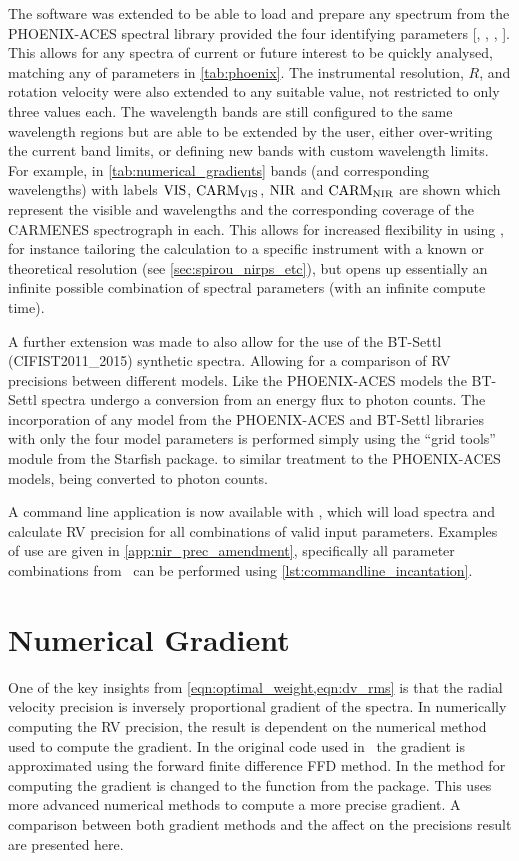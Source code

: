 The software was extended to be able to load and prepare any spectrum from the {PHOENIX-ACES} spectral library provided the four identifying parameters [\Teff, \Logg, \feh{}, \alphafe{}].
This allows for any spectra of current or future interest to be quickly analysed, matching any of parameters in \cref{tab:phoenix}.
The instrumental resolution, \(R\), and rotation velocity \Vsini{} were also extended to any suitable value, not restricted to only three values each.
The \nir{} wavelength bands are still configured to the same wavelength regions but are able to be extended by the user, either over-writing the current band limits, or defining new bands with custom wavelength limits.
For example, in \cref{tab:numerical_gradients} bands (and corresponding wavelengths) with labels \({\rm VIS}\), \(\rm {CARM}_{VIS}\), \(\rm {NIR}\) and \(\rm {CARM}_{NIR}\) are shown which represent the visible and \nir{} wavelengths and the corresponding coverage of the {CARMENES} spectrograph in each.
This allows for increased flexibility in using \eniric{}, for instance tailoring the calculation to a specific instrument with a known or theoretical resolution (see \cref{sec:spirou_nirps_etc}), but opens up essentially an infinite possible combination of spectral parameters (with an infinite compute time).

A further extension was made to also allow for the use of the {BT-Settl} ({CIFIST2011\_2015}) synthetic spectra.
Allowing for a comparison of RV precisions between different models.
Like the {PHOENIX-ACES} models the {BT-Settl} spectra undergo a conversion from an energy flux to photon counts.
The incorporation of any model from the {PHOENIX-ACES} and {BT-Settl} libraries with only the four model parameters is performed simply using the ``grid tools'' module from the Starfish package\citep{czekala_constructing_2015}.
to similar treatment to the {PHOENIX-ACES} models, being converted to photon counts.

A command line application is now available with \eniric{}, which will load spectra and calculate RV precision for all combinations of valid input parameters.
Examples of use are given in \cref{app:nir_prec_amendment}, specifically all parameter combinations from~\citep{figueira_radial_2016} can be performed using \cref{lst:commandline_incantation}.


\section{Numerical Gradient}
\label{sec:numerical_gradient}
One of the key insights from \cref{eqn:optimal_weight,eqn:dv_rms} is that the radial velocity precision is inversely proportional gradient of the spectra.
In numerically computing the {RV} precision, the result is dependent on the numerical method used to compute the gradient.
In the original code used in~\citet{figueira_radial_2016} the gradient is approximated using the forward finite difference {FFD} method.
In \eniric{} the method for computing the gradient is changed to the \npgradient{} function from the \numpy{} package.
This uses more advanced numerical methods to compute a more precise gradient.
A comparison between both gradient methods and the affect on the precisions result are presented here.


